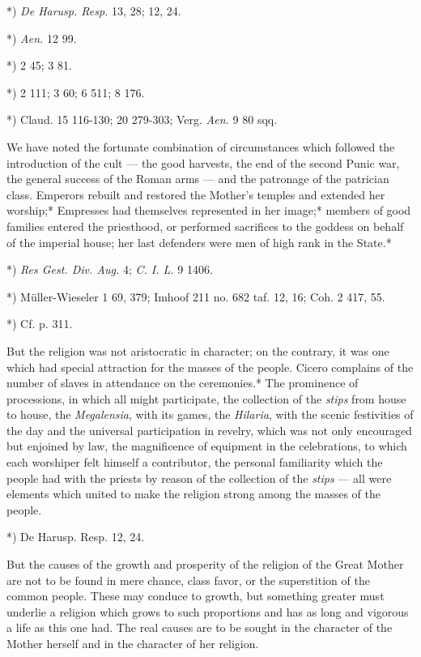 \documentclass[a4paper, 11pt, oneside, polutonikogreek, english]{article}
\begin{document}
*) \emph{De Harusp. Resp.} 13, 28; 12, 24.

*) \emph{Aen.} 12 99.

*) 2 45; 3 81.

*) 2 111; 3 60; 6 511; 8 176.

*) Claud. 15 116-130; 20 279-303; Verg. \emph{Aen.} 9 80 sqq.

We have noted the fortunate combination of circumstances which followed the introduction of the cult --- the good harvests, the end of the second Punic war, the general success of the Roman arms --- and the patronage of the patrician class. Emperors rebuilt and restored the Mother's temples and extended her worship;* Empresses had themselves represented in her image;* members of good families entered the priesthood, or performed sacrifices to the goddess on behalf of the imperial house; her last defenders were men of high rank in the State.*

*) \emph{Res Gest. Div. Aug.} 4; \emph{C. I. L.} 9 1406.

*) Müller-Wieseler 1 69, 379; Imhoof 211 no. 682 taf. 12, 16; Coh. 2 417, 55.

*) Cf. p. 311.

But the religion was not aristocratic in character; on the contrary, it was one which had special attraction for the masses of the people. Cicero complains of the number of slaves in attendance on the ceremonies.* The prominence of processions, in which all might participate, the collection of the \emph{stips} from house to house, the \emph{Megalensia}, with its games, the \emph{Hilaria}, with the scenic festivities of the day and the universal participation in revelry, which was not only encouraged but enjoined by law, the magnificence of equipment in the celebrations, to which each worshiper felt himself a contributor, the personal familiarity which the people had with the priests by reason of the collection of the \emph{stips} --- all were elements which united to make the religion strong among the masses of the people.

*) De Harusp. Resp. 12, 24.

But the causes of the growth and prosperity of the religion of the Great Mother are not to be found in mere chance, class favor, or the superstition of the common people. These may conduce to growth, but something greater must underlie a religion which grows to such proportions and has as long and vigorous a life as this one had. The real causes are to be sought in the character of the Mother herself and in the character of her religion.
\end{document}
